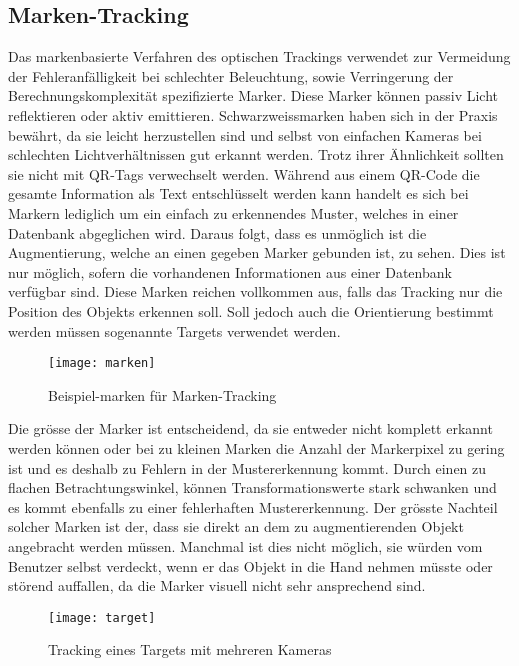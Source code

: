 \subsection*{Marken-Tracking}
Das markenbasierte Verfahren des optischen Trackings verwendet zur Vermeidung der Fehleranfälligkeit bei schlechter Beleuchtung, sowie Verringerung der Berechnungskomplexität spezifizierte Marker. Diese Marker können passiv Licht reflektieren oder aktiv emittieren. Schwarzweissmarken haben sich in der Praxis bewährt, da sie leicht herzustellen sind und selbst von einfachen Kameras bei schlechten Lichtverhältnissen gut erkannt werden. Trotz ihrer Ähnlichkeit sollten sie nicht mit QR-Tags verwechselt werden. Während aus einem QR-Code die gesamte Information als Text entschlüsselt werden kann handelt es sich bei Markern lediglich um ein einfach zu erkennendes Muster, welches in einer Datenbank abgeglichen wird. Daraus folgt, dass es unmöglich ist die Augmentierung, welche an einen gegeben Marker gebunden ist, zu sehen. Dies ist nur möglich, sofern die vorhandenen Informationen aus einer Datenbank verfügbar sind. Diese Marken reichen vollkommen aus, falls das Tracking nur die Position des Objekts erkennen soll. Soll jedoch auch die Orientierung bestimmt werden müssen sogenannte Targets verwendet werden.\cite[S.~104~ff.]{doerner13}
\newpage
\begin{wrapfigure}{r}{0.35\textwidth}
	\vspace{-15pt}
	\begin{center}
		\texttt{[image: marken]}
	\end{center}
	\vspace{-15pt}
	\captionsetup{width=0.3\textwidth}
	\caption{Beispiel-marken für Marken-Tracking}\label{marken}
	\vspace{-12pt}
\end{wrapfigure}
Die grösse der Marker ist entscheidend, da sie entweder nicht komplett erkannt werden können oder bei zu kleinen Marken die Anzahl der Markerpixel zu gering ist und es deshalb zu Fehlern in der Mustererkennung kommt. Durch einen zu flachen Betrachtungswinkel, können Transformationswerte stark schwanken und es kommt ebenfalls zu einer fehlerhaften Mustererkennung. Der grösste Nachteil solcher Marken ist der, dass sie direkt an dem zu augmentierenden Objekt angebracht werden müssen. Manchmal ist dies nicht möglich, sie würden vom Benutzer selbst verdeckt, wenn er das Objekt in die Hand nehmen müsste oder störend auffallen, da die Marker visuell nicht sehr ansprechend sind.\cite[S.~256~ff.]{doerner13}\\[6pt]
\vspace{-20pt}
\begin{wrapfigure}{l}{0.35\textwidth}
	\vspace{-30pt}
	\begin{center}
		\texttt{[image: target]}
	\end{center}
	\vspace{-15pt}
	\captionsetup{width=0.3\textwidth}
	\caption{Tracking eines Targets mit mehreren Kameras}\label{target}
	\vspace{-12pt}
\end{wrapfigure}

